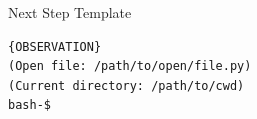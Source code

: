 {
\captionsetup{type=figure}
\begin{promptbox}{Next Step Template}
\begin{verbatim}
{OBSERVATION}
(Open file: /path/to/open/file.py)
(Current directory: /path/to/cwd)
bash-$
\end{verbatim}
\end{promptbox}
\label{fig.prompts.next_step}
}